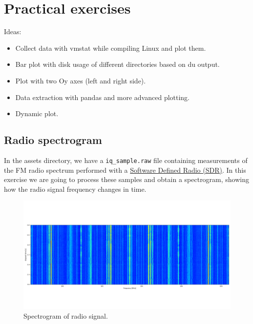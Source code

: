 \newpage

\section{Practical exercises}

Ideas:
\begin{itemize}
    \item Collect data with vmstat while compiling Linux and plot them.

    \item Bar plot with disk usage of different directories based on du output.

    \item Plot with two Oy axes (left and right side).

    \item Data extraction with pandas and more advanced plotting.

    \item Dynamic plot.
\end{itemize}

\subsection{Radio spectrogram}

In the assets directory, we have a \texttt{iq\_sample.raw} file containing
measurements of the FM radio spectrum performed with a
\href{https://blinry.org/50-things-with-sdr/}{Software Defined Radio (SDR)}. In
this exercise we are going to process these samples and obtain a spectrogram,
showing how the radio signal frequency changes in time.

\begin{figure}[h]
    \centering
    \includegraphics[width=\textwidth,keepaspectratio]{figures/waterfall.png}
    \caption{Spectrogram of radio signal.}
    \label{fig:spectrogram}
\end{figure}

